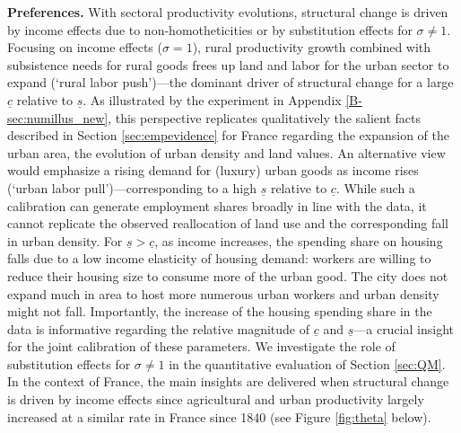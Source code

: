 \documentclass[20250130-paper.tex]{subfiles}
\begin{document}
\textbf{Preferences.} With sectoral productivity evolutions, structural change is driven by income effects due to non-homotheticities or by substitution effects for $\sigma \ne 1$. Focusing on income effects ($\sigma = 1$), rural productivity growth combined with subsistence needs for rural goods frees up land and labor for the urban sector to expand (`rural labor push')---the dominant driver of structural change for a large $\underline{c}$ relative to $\underline{s}$. As illustrated by the experiment in Appendix \ref{B-sec:numillus_new}, this perspective replicates qualitatively the salient facts described in Section \ref{sec:empevidence} for France regarding the expansion of the urban area, the evolution of urban density and land values. An alternative view would emphasize a rising demand for (luxury) urban goods as income rises (`urban labor pull')---corresponding to a high $\underline{s}$ relative to $\underline{c}$. While such a calibration can generate employment shares broadly in line with the data, it cannot replicate the observed reallocation of land use and the corresponding fall in urban density. For $\underline{s}>\underline{c}$, as income increases, the spending share on housing falls due to a low income elasticity of housing demand: workers are willing to reduce their housing size to consume more of the urban good. The city does not expand much in area to host more numerous urban workers and urban density might not fall. Importantly, the increase of the housing spending share in the data is informative regarding the relative magnitude of $\underline{c}$ and $\underline{s}$---a crucial insight for the joint calibration of these parameters. We investigate the role of substitution effects for $\sigma \ne 1$ in the quantitative evaluation of Section \ref{sec:QM}. In the context of France, the main insights are delivered when structural change is driven by income effects since agricultural and urban productivity largely increased at a similar rate in France since 1840 (see Figure \ref{fig:theta} below). 
\end{document}
